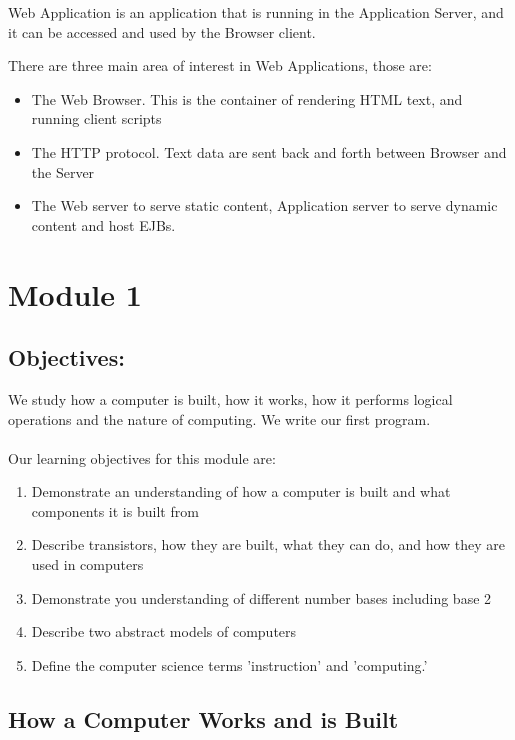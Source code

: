 \documentclass{article}
\begin{document}
Web Application is an application that is running in the Application Server, and it can be accessed and used by the Browser client.

There are three main area of interest in Web Applications, those are:
\begin{itemize}
\item The Web Browser. This is the container of rendering HTML text, and running client scripts
\item The HTTP protocol. Text data are sent back and forth between Browser and the Server
\item The Web server to serve static content, Application server to serve dynamic content and host EJBs.
\end{itemize}

\section{Module 1}

\subsection{Objectives:}

We study how a computer is built, how it works, how it performs logical operations and the nature of computing. We write our first program.
\\
\\
Our learning objectives for this module are:

\begin{enumerate}
\item Demonstrate an understanding of how a computer is built and what components it is built from
\item Describe transistors, how they are built, what they can do, and how they are used in computers
\item Demonstrate you understanding of different number bases including base 2
\item Describe two abstract models of computers
\item Define the computer science terms 'instruction' and 'computing.'
\end{enumerate}

\subsection{How a Computer Works and is Built}
\end{document}
